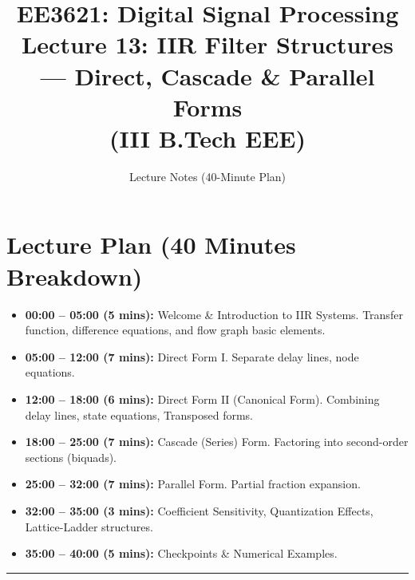 \documentclass[11pt,a4paper]{article}
\title{\textbf{EE3621: Digital Signal Processing} \\ \Large Lecture 13: IIR Filter Structures --- Direct, Cascade \& Parallel Forms \\ \large (III B.Tech EEE)}
\author{Lecture Notes (40-Minute Plan)}
\date{}
\begin{document}
\maketitle

\section{Lecture Plan (40 Minutes Breakdown)}
\begin{itemize}
    \item \textbf{00:00 -- 05:00 (5 mins):} Welcome \& Introduction to IIR Systems. Transfer function, difference equations, and flow graph basic elements.
    \item \textbf{05:00 -- 12:00 (7 mins):} Direct Form I. Separate delay lines, node equations.
    \item \textbf{12:00 -- 18:00 (6 mins):} Direct Form II (Canonical Form). Combining delay lines, state equations, Transposed forms.
    \item \textbf{18:00 -- 25:00 (7 mins):} Cascade (Series) Form. Factoring into second-order sections (biquads).
    \item \textbf{25:00 -- 32:00 (7 mins):} Parallel Form. Partial fraction expansion.
    \item \textbf{32:00 -- 35:00 (3 mins):} Coefficient Sensitivity, Quantization Effects, Lattice-Ladder structures.
    \item \textbf{35:00 -- 40:00 (5 mins):} Checkpoints \& Numerical Examples.
\end{itemize}

\noindent\rule{\textwidth}{0.5pt}
\end{document}
